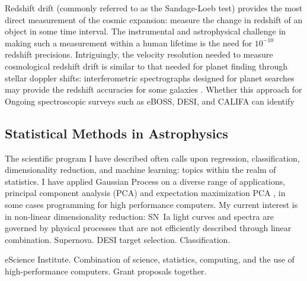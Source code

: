 \documentclass{article}
\begin{document}
Redshift drift (commonly referred to as the Sandage-Loeb test) provides the most direct  measurement
of the cosmic expansion: measure the change in redshift of an object in some time interval.  The instrumental
and astrophysical challenge
in making such a measurement within a human lifetime
is the need for $10^{-10}$ redshift precisions.  Intriguingly, the velocity resolution needed to measure
cosmological redshift drift is similar to that needed for planet finding through stellar doppler shifts:
interferometric spectrographs designed for planet searches may provide the redshift accuracies for some galaxies
\cite{drift}.
Whether this approach for 
Ongoing spectroscopic surveys such as eBOSS, DESI, and CALIFA can identify 

\subsection{Statistical Methods in Astrophysics}
The scientific program I have described often calls upon regression, classification, dimensionality reduction,
and machine learning: topics within the realm of statistics.  I have applied Gaussian Process
on a diverse range of applications, principal component
analysis (PCA) and expectation maximization PCA \cite{2012PhRvD..85l3530S,2013ApJ...766...84K,
2013PhRvD..87l3512H}, in some cases programming for high performance computers.
My current interest is in non-linear dimensionality reduction: SN~Ia light curves and spectra
are governed by physical processes that are not efficiently described through linear combination.
Supernova.  DESI target selection.  Classification.

eScience Institute.  Combination of science, statistics, computing, and the use of high-performance computers.
Grant proposals together.
\end{document}
